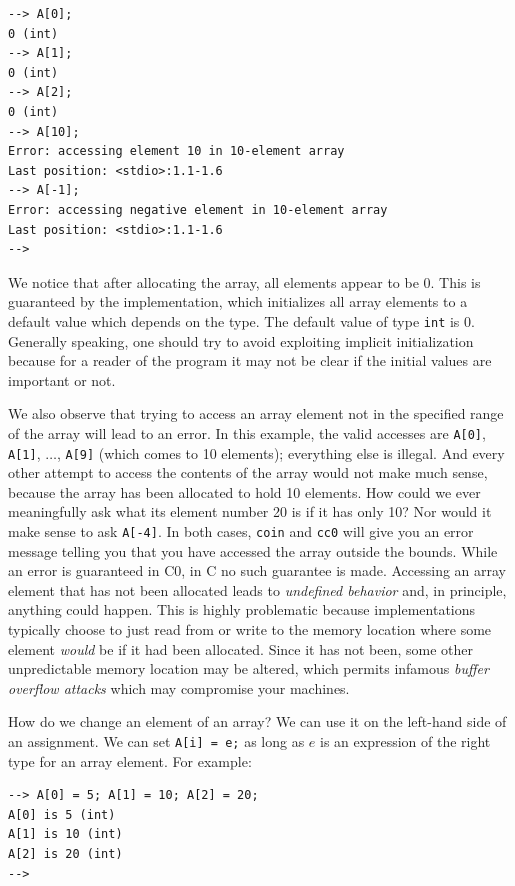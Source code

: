 \begin{lstlisting}[language={[coin]C}]
--> A[0];
0 (int)
--> A[1];
0 (int)
--> A[2];
0 (int)
--> A[10];
Error: accessing element 10 in 10-element array
Last position: <stdio>:1.1-1.6
--> A[-1];
Error: accessing negative element in 10-element array
Last position: <stdio>:1.1-1.6
-->
\end{lstlisting}

We notice that after allocating the array, all elements appear to be
0.  This is guaranteed by the implementation, which initializes all
array elements to a default value which depends on the type.  The
default value of type \lstinline'int' is 0.  Generally speaking, one
should try to avoid exploiting implicit initialization because for a
reader of the program it may not be clear if the initial values are
important or not.

We also observe that trying to access an array element not in the
specified range of the array will lead to an error.  In this example,
the valid accesses are \lstinline'A[0]', \lstinline'A[1]', $\ldots$,
\lstinline'A[9]' (which comes to 10 elements); everything else is
illegal.  And every other attempt to access the contents of the array
would not make much sense, because the array has been allocated to
hold 10 elements. How could we ever meaningfully ask what its element
number 20 is if it has only 10? Nor would it make sense to ask
\lstinline'A[-4]'. In both cases, \lstinline'coin' and \lstinline'cc0'
will give you an error message telling you that you have accessed the
array outside the bounds.  While an error is guaranteed in C0, in C no
such guarantee is made.  Accessing an array element that has not been
allocated leads to \emph{undefined behavior} and, in principle,
anything could happen.  This is highly problematic because
implementations typically choose to just read from or write to the
memory location where some element \emph{would} be if it had been
allocated.  Since it has not been, some other unpredictable memory
location may be altered, which permits infamous \emph{buffer overflow
  attacks} which may compromise your machines.

How do we change an element of an array?  We can use it on the
left-hand side of an assignment.  We can set \lstinline'A[i] = e;' as
long as $e$ is an expression of the right type for an array element.
For example:


\begin{lstlisting}[language={[coin]C}]
--> A[0] = 5; A[1] = 10; A[2] = 20;
A[0] is 5 (int)
A[1] is 10 (int)
A[2] is 20 (int)
-->
\end{lstlisting}

